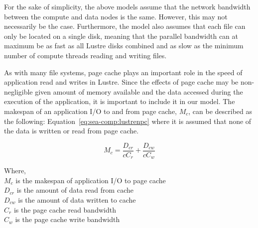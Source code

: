 \documentclass[10pt,journal,compsoc]{IEEEtran}
\begin{document}
      For the sake of simplicity, the above models assume that the network
      bandwidth between the compute and data nodes is the same. However, this
      may not necessarily be the case. Furthermore, the model also assumes that
      each file can only be located on a single disk, meaning that the parallel
      bandwidth can at maximum be as fast as all Lustre disks combined and as
      slow as the minimum number of compute threads reading and writing files.

      As with many file systems, page cache plays an important role in the speed
      of application read and writes in Lustre. Since the effects of page cache
      may be non-negligible given amount of memory available and the data
      accessed during the execution of the application, it is important to
      include it in our model. The makespan of an application I/O to and from
      page cache, $M_{c}$, can be described as the following:
      Equation~\ref{eq:sea-comp:lustrenpc} where it is assumed that none of the
      data is written or read from page cache.


      \begin{equation}\label{eq:sea-comp:cache}
          M_{c} = \frac{D_{cr}}{cC_{r}} + \frac{D_{cw}}{cC_{w}}
      \end{equation}

      {\noindent} Where, \\
      $M_{c}$ is the makespan of application I/O to page cache \\
      $D_{cr}$ is the amount of data read from cache \\
      $D_{cw}$ is the amount of data written to cache \\
      $C_{r}$ is the page cache read bandwidth \\
      $C_{w}$ is the page cache write bandwidth \\ 


    

\end{document}
